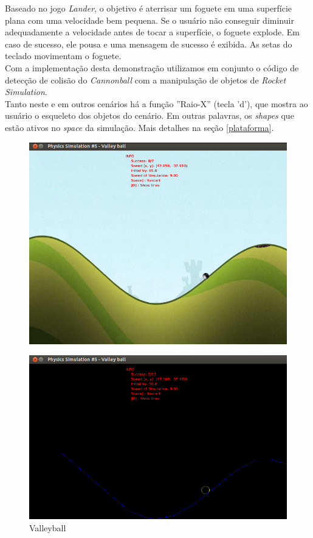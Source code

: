 Baseado no jogo \textit{Lander}, o objetivo é aterrisar um foguete em uma superfície plana com uma velocidade bem pequena. Se o usuário não conseguir diminuir adequadamente a velocidade antes de tocar a superfície, o foguete explode. Em caso de sucesso, ele pousa e uma mensagem de sucesso é exibida. As setas do teclado movimentam o foguete. \\

Com a implementação desta demonstração utilizamos em conjunto o código de detecção de colisão do \textit{Cannonball} com a manipulação de objetos de \textit{Rocket Simulation}. \\

Tanto neste e em outros cenários há a função ''Raio-X'' (tecla 'd'), que mostra ao usuário o esqueleto dos objetos do cenário. Em outras palavras, os \textit{shapes} que estão ativos no \textit{space} da simulação. Mais detalhes na seção \ref{plataforma}.

\begin{figure}[H]
\centering
  \includegraphics[scale=0.4]{images/valleyball.png}
\end{figure}
\begin{figure}[H]
\centering
  \includegraphics[scale=0.4]{images/valleyballE.png}
  \caption{Valleyball}
\end{figure}

